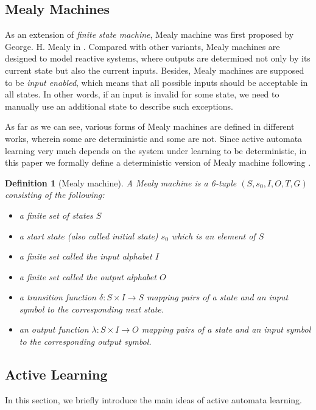 \documentclass[conference, a4paper]{IEEEtran}
\newtheorem{definition}{Definition}
\begin{document}
\subsection{Mealy Machines}

As an extension of \emph{finite state machine}, Mealy machine was first proposed by George. H. Mealy
in \cite{George1955A}. Compared with other variants, Mealy machines are designed to model
reactive systems, where outputs are determined not only by its current state but also the current
inputs. Besides, Mealy machines are supposed to be \emph{input enabled}, which means that all
possible inputs should be acceptable in all states. In other words, if an input is invalid for some
state, we need to manually use an additional state to describe such exceptions.

As far as we can see, various forms of Mealy machines are defined in different works, wherein some
are deterministic and some are not. Since active automata learning very much depends on the system
under learning to be deterministic, in this paper we formally define a deterministic version of
Mealy machine following \cite{DBLP:conf/sfm/SteffenHM11}.

\begin{definition}[Mealy machine]
  A Mealy machine is a 6-tuple $(S, s_0, I, O, T, G)$ consisting of the following:
  \begin{itemize}
    \item[-] a finite set of states $S$
    \item[-] a start state (also called initial state) $s_0$ which is an element of $S$
    \item[-] a finite set called the input alphabet $I$
    \item[-] a finite set called the output alphabet $O$
    \item[-] a transition function $\delta : S \times I \rightarrow S$ mapping pairs of a
      state and an input symbol to the corresponding next state.
    \item[-] an output function $\lambda : S \times I \rightarrow O$ mapping pairs
      of a state and an input symbol to the corresponding output symbol.
  \end{itemize}
\end{definition}

\subsection{Active Learning}
In this section, we briefly introduce the main ideas of active automata learning. 
\end{document}
